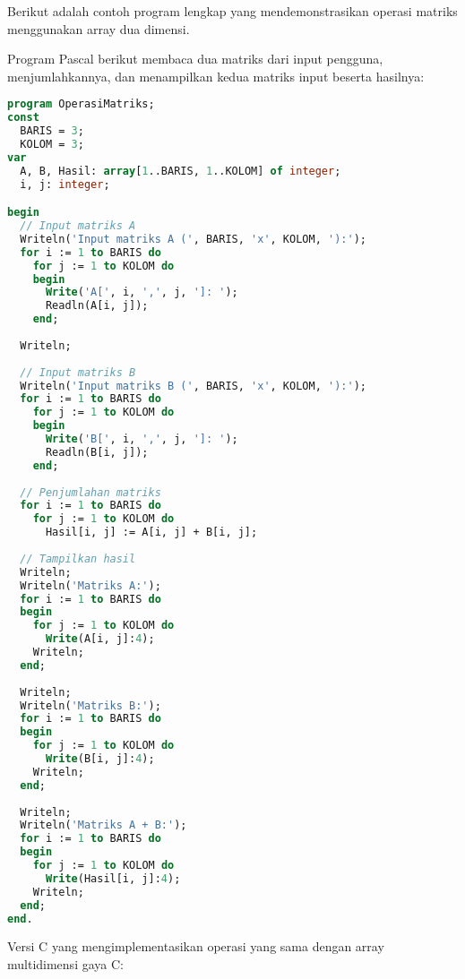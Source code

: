 \documentclass[../main.tex]{subfiles}
\begin{document}
Berikut adalah contoh program lengkap yang mendemonstrasikan operasi matriks menggunakan array dua dimensi.

Program Pascal berikut membaca dua matriks dari input pengguna, menjumlahkannya, dan menampilkan kedua matriks input beserta hasilnya:

\begin{lstlisting}[language=Pascal, caption={Program operasi matriks di Pascal}]
program OperasiMatriks;
const
  BARIS = 3;
  KOLOM = 3;
var
  A, B, Hasil: array[1..BARIS, 1..KOLOM] of integer;
  i, j: integer;

begin
  // Input matriks A
  Writeln('Input matriks A (', BARIS, 'x', KOLOM, '):');
  for i := 1 to BARIS do
    for j := 1 to KOLOM do
    begin
      Write('A[', i, ',', j, ']: ');
      Readln(A[i, j]);
    end;
  
  Writeln;
  
  // Input matriks B
  Writeln('Input matriks B (', BARIS, 'x', KOLOM, '):');
  for i := 1 to BARIS do
    for j := 1 to KOLOM do
    begin
      Write('B[', i, ',', j, ']: ');
      Readln(B[i, j]);
    end;
  
  // Penjumlahan matriks
  for i := 1 to BARIS do
    for j := 1 to KOLOM do
      Hasil[i, j] := A[i, j] + B[i, j];
  
  // Tampilkan hasil
  Writeln;
  Writeln('Matriks A:');
  for i := 1 to BARIS do
  begin
    for j := 1 to KOLOM do
      Write(A[i, j]:4);
    Writeln;
  end;
  
  Writeln;
  Writeln('Matriks B:');
  for i := 1 to BARIS do
  begin
    for j := 1 to KOLOM do
      Write(B[i, j]:4);
    Writeln;
  end;
  
  Writeln;
  Writeln('Matriks A + B:');
  for i := 1 to BARIS do
  begin
    for j := 1 to KOLOM do
      Write(Hasil[i, j]:4);
    Writeln;
  end;
end.
\end{lstlisting}

Versi C yang mengimplementasikan operasi yang sama dengan array multidimensi gaya C:
\end{document}
